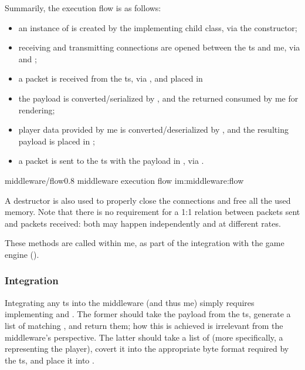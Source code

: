 Summarily, the execution flow is as follows:

\begin{itemize}
	\item an instance of  is created by the implementing child class, via the  constructor;
	\item receiving and transmitting connections are opened between the \gls{ts} and \gls{me}, via  and ;
	\item a \gls{packet} is received from the \gls{ts}, via , and placed in 
	\item the \gls{payload} is converted/serialized by , and the returned  consumed by \gls{me} for rendering;
	\item player data provided by \gls{me} is converted/deserialized by , and the resulting \gls{payload} is placed in ;
	\item a \gls{packet} is sent to the \gls{ts} with the \gls{payload} in , via .
\end{itemize}

\begin{image}
	{middleware/flow}{0.8}
	{\gls{middleware} execution flow}
	{im:middleware:flow}
	{}
	{}
\end{image}

A destructor is also used to properly close the connections and free all the used memory. Note that there is no requirement for a 1:1 relation between \glspl{packet} sent and \glspl{packet} received: both may happen independently and at different rates.

These methods are called within \gls{me}, as part of the integration with the game engine ().

\subsubsection{Integration}

Integrating any \gls{ts} into the \gls{middleware} (and thus \gls{me}) simply requires implementing  and . The former should take the \gls{payload} from the \gls{ts}, generate a list of matching , and return them; how this is achieved is irrelevant from the \gls{middleware}'s perspective. The latter should take a list of  (more specifically, a  representing the player), covert it into the appropriate byte format required by the \gls{ts}, and place it into .


